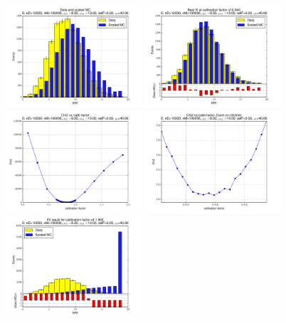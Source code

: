 
 \begin{figure}[htbp] \begin{center} 
\includegraphics[width=0.45\textwidth]{../FIGURES/05/FIG_Data_and_scaled_MC.pdf} 
\includegraphics[width=0.45\textwidth]{../FIGURES/05/FIG_Best_fit_at_calibration_factor_of_0_840.pdf} 
\includegraphics[width=0.45\textwidth]{../FIGURES/05/FIG_Chi2_vs_calib_factor.pdf} 
\includegraphics[width=0.45\textwidth]{../FIGURES/05/FIG_Chi2_vs_calib_factor_Zoom_on_chi2min.pdf} 
\includegraphics[width=0.45\textwidth]{../FIGURES/05/FIG_Fit_result_for_calibration_factor_of_1_900.pdf} 

\end{center}
\end{figure}
